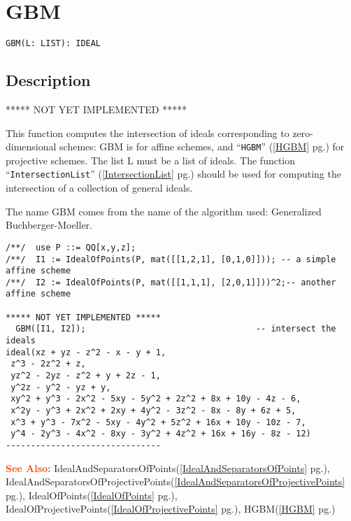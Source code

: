 \documentclass[a4paper]{mybook}
\newenvironment{command}{}{} %
\newcommand\SeeAlso{\par\textcolor{OrangeRed}{\textbf{\large See Also: }}}
\begin{document}
\section{GBM}
\label{GBM}
\begin{command} %


\begin{Verbatim}[label=syntax, rulecolor=\color{MidnightBlue},
frame=single]
GBM(L: LIST): IDEAL
\end{Verbatim}


\subsection*{Description}

***** NOT YET IMPLEMENTED *****
\par 
This function computes the intersection of ideals corresponding to
zero-dimensional schemes: GBM is for affine schemes, and ``\verb&HGBM&'' (\ref{HGBM} pg.\pageref{HGBM}) for
projective schemes.  The list L must be a list of ideals.  The function
``\verb&IntersectionList&'' (\ref{IntersectionList} pg.\pageref{IntersectionList}) should be used for computing the intersection of a
collection of general ideals.
\par 
The name GBM comes from the name of the algorithm used: Generalized
Buchberger-Moeller.
\begin{Verbatim}[label=example, rulecolor=\color{PineGreen}, frame=single]
/**/  use P ::= QQ[x,y,z];
/**/  I1 := IdealOfPoints(P, mat([[1,2,1], [0,1,0]])); -- a simple affine scheme
/**/  I2 := IdealOfPoints(P, mat([[1,1,1], [2,0,1]]))^2;-- another affine scheme

***** NOT YET IMPLEMENTED *****
  GBM([I1, I2]);                                  -- intersect the ideals
ideal(xz + yz - z^2 - x - y + 1,
 z^3 - 2z^2 + z,
 yz^2 - 2yz - z^2 + y + 2z - 1,
 y^2z - y^2 - yz + y,
 xy^2 + y^3 - 2x^2 - 5xy - 5y^2 + 2z^2 + 8x + 10y - 4z - 6,
 x^2y - y^3 + 2x^2 + 2xy + 4y^2 - 3z^2 - 8x - 8y + 6z + 5,
 x^3 + y^3 - 7x^2 - 5xy - 4y^2 + 5z^2 + 16x + 10y - 10z - 7,
 y^4 - 2y^3 - 4x^2 - 8xy - 3y^2 + 4z^2 + 16x + 16y - 8z - 12)
-------------------------------
\end{Verbatim}


\SeeAlso %
  IdealAndSeparatorsOfPoints(\ref{IdealAndSeparatorsOfPoints} pg.\pageref{IdealAndSeparatorsOfPoints}), 
    IdealAndSeparatorsOfProjectivePoints(\ref{IdealAndSeparatorsOfProjectivePoints} pg.\pageref{IdealAndSeparatorsOfProjectivePoints}), 
    IdealOfPoints(\ref{IdealOfPoints} pg.\pageref{IdealOfPoints}), 
    IdealOfProjectivePoints(\ref{IdealOfProjectivePoints} pg.\pageref{IdealOfProjectivePoints}), 
    HGBM(\ref{HGBM} pg.\pageref{HGBM})
\end{command} %
\end{document}
